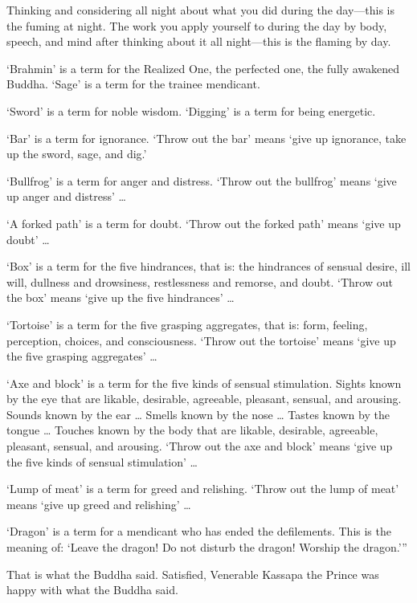 \documentclass[12pt,openany]{book}%
\begin{document}
Thinking and considering all night about what you did during the day—this is the fuming at night. The work you apply yourself to during the day by body, speech, and mind after thinking about it all night—this is the flaming by day. 

‘Brahmin’ is a term for the Realized One, the perfected one, the fully awakened Buddha. ‘Sage’ is a term for the trainee mendicant. 

‘Sword’ is a term for noble wisdom. ‘Digging’ is a term for being energetic. 

‘Bar’ is a term for ignorance. ‘Throw out the bar’ means ‘give up ignorance, take up the sword, sage, and dig.’ 

‘Bullfrog’ is a term for anger and distress. ‘Throw out the bullfrog’ means ‘give up anger and distress’ … 

‘A forked path’ is a term for doubt. ‘Throw out the forked path’ means ‘give up doubt’ … 

‘Box’ is a term for the five hindrances, that is: the hindrances of sensual desire, ill will, dullness and drowsiness, restlessness and remorse, and doubt. ‘Throw out the box’ means ‘give up the five hindrances’ … 

‘Tortoise’ is a term for the five grasping aggregates, that is: form, feeling, perception, choices, and consciousness. ‘Throw out the tortoise’ means ‘give up the five grasping aggregates’ … 

‘Axe and block’ is a term for the five kinds of sensual stimulation. Sights known by the eye that are likable, desirable, agreeable, pleasant, sensual, and arousing. Sounds known by the ear … Smells known by the nose … Tastes known by the tongue … Touches known by the body that are likable, desirable, agreeable, pleasant, sensual, and arousing. ‘Throw out the axe and block’ means ‘give up the five kinds of sensual stimulation’ … 

‘Lump of meat’ is a term for greed and relishing. ‘Throw out the lump of meat’ means ‘give up greed and relishing’ … 

‘Dragon’ is a term for a mendicant who has ended the defilements. This is the meaning of: ‘Leave the dragon! Do not disturb the dragon! Worship the dragon.’” 

That is what the Buddha said. Satisfied, Venerable Kassapa the Prince was happy with what the Buddha said. 
\end{document}
